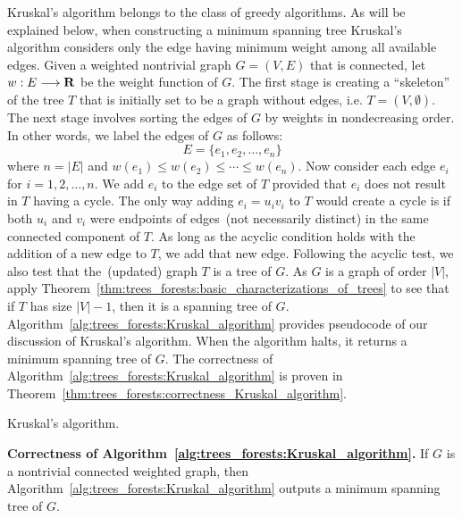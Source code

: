 Kruskal's algorithm belongs to the class of
greedy algorithms. As will be explained below,
when constructing a minimum spanning tree
Kruskal's algorithm considers only the edge
having minimum weight among all available
edges. Given a weighted nontrivial graph
$G = (V,E)$ that is connected, let $w: E \longrightarrow \mathbf{R}$ be the
weight function of $G$. The first stage is
creating a ``skeleton'' of the tree $T$ that is initially set to be a
graph without edges, i.e. $T = (V, \emptyset)$. The next stage
involves sorting the edges of $G$ by weights in nondecreasing
order. In other words, we label the edges of $G$ as follows:
\[
E
=
\{e_1, e_2, \dots, e_n\}
\]
where $n = |E|$ and $w(e_1) \leq w(e_2) \leq \cdots \leq w(e_n)$.
Now consider each edge $e_i$ for $i = 1,2,\dots,n$. We add $e_i$ to
the edge set of $T$ provided that $e_i$ does not result in $T$ having
a cycle. The only way adding $e_i = u_i v_i$ to $T$
would create a cycle is if both $u_i$ and $v_i$ were
endpoints of edges~(not necessarily distinct) in
the same connected component of $T$. As
long as the acyclic condition holds with the addition
of a new edge to $T$, we add that new edge. Following the
acyclic test, we also test that the~(updated) graph $T$
is a tree of $G$. As $G$ is a graph of order $|V|$, apply
Theorem~\ref{thm:trees_forests:basic_characterizations_of_trees} to
see that if $T$ has size $|V| - 1$, then it is a
spanning tree of $G$.
Algorithm~\ref{alg:trees_forests:Kruskal_algorithm} provides
pseudocode of our discussion of Kruskal's
algorithm. When the algorithm halts, it returns a
minimum spanning tree of $G$. The
correctness of Algorithm~\ref{alg:trees_forests:Kruskal_algorithm} is
proven in Theorem~\ref{thm:trees_forests:correctness_Kruskal_algorithm}.

\begin{algorithm}[!htbp]

\caption{Kruskal's algorithm.}
\label{alg:trees_forests:Kruskal_algorithm}
\end{algorithm}

\begin{theorem}
\label{thm:trees_forests:correctness_Kruskal_algorithm}
\textbf{Correctness of Algorithm~\ref{alg:trees_forests:Kruskal_algorithm}.}
If $G$ is a nontrivial connected weighted graph, then
Algorithm~\ref{alg:trees_forests:Kruskal_algorithm} outputs a minimum
spanning tree of $G$.
\end{theorem}

